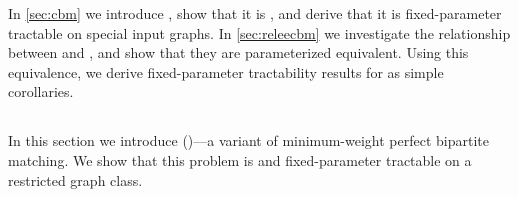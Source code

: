 In \autoref{sec:cbm} we introduce \pCBMs{}, show that it is \NPh{}, and derive that it is fixed-parameter tractable on special input graphs. In \autoref{sec:releecbm} we investigate the relationship between \pWMEEs{} and \pCBMs{}, and show that they are parameterized equivalent. Using this equivalence, we derive fixed-parameter tractability results for \pWMEEs{} as simple corollaries.

\subsection{\pCBM{}}\label{sec:cbm}

In this section we introduce \pCBM{} (\pCBMs{})---a variant of minimum-weight perfect bipartite matching. We show that this problem is \NPh{} and fixed-parameter tractable on a restricted graph class.

